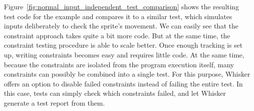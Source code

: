 Figure~\ref{fig:normal_input_independent_test_comparison} shows the resulting test code for the example
and compares it to a similar test, which simulates inputs deliberately to check the sprite's movement.
We can easily see that the constraint approach takes quite a bit more code.
But at the same time, the constraint testing procedure is able to scale better.
Once enough tracking is set up, writing constraints becomes easy and requires little code.
At the same time, because the constraints are isolated from the program execution itself,
many constraints can possibly be combined into a single test.
For this purpose, Whisker offers an option to disable failed constraints instead of failing the entire test.
In this case, tests can simply check which constraints failed, and let Whisker generate a test report from them.

